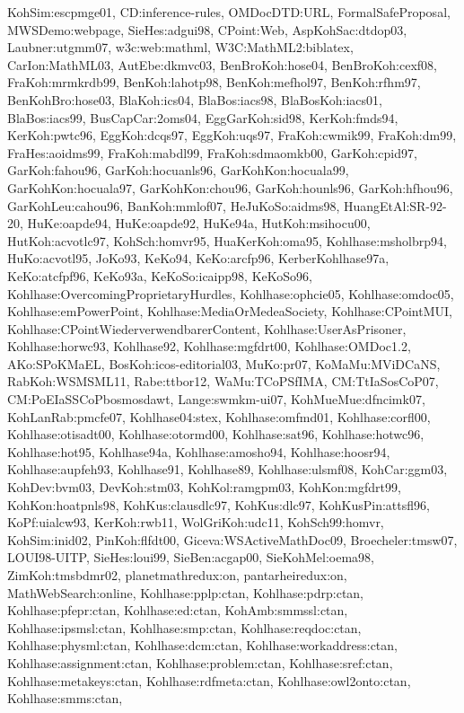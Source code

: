 {KohSim:escpmge01,
CD:inference-rules,
OMDocDTD:URL,
FormalSafeProposal,
MWSDemo:webpage,
SieHes:adgui98,
CPoint:Web,
AspKohSac:dtdop03,
Laubner:utgmm07,
w3c:web:mathml,
W3C:MathML2:biblatex,
CarIon:MathML03,
AutEbe:dkmvc03,
BenBroKoh:hose04,
BenBroKoh:cexf08,
FraKoh:mrmkrdb99,
BenKoh:lahotp98,
BenKoh:mefhol97,
BenKoh:rfhm97,
BenKohBro:hose03,
BlaKoh:ics04,
BlaBos:iacs98,
BlaBosKoh:iacs01,
BlaBos:iacs99,
BusCapCar:2oms04,
EggGarKoh:sid98,
KerKoh:fmds94,
KerKoh:pwtc96,
EggKoh:dcqs97,
EggKoh:uqs97,
FraKoh:cwmik99,
FraKoh:dm99,
FraHes:aoidms99,
FraKoh:mabdl99,
FraKoh:sdmaomkb00,
GarKoh:cpid97,
GarKoh:fahou96,
GarKoh:hocuanls96,
GarKohKon:hocuala99,
GarKohKon:hocuala97,
GarKohKon:chou96,
GarKoh:hounls96,
GarKoh:hfhou96,
GarKohLeu:cahou96,
BanKoh:mmlof07,
HeJuKoSo:aidms98,
HuangEtAl:SR-92-20,
HuKe:oapde94,
HuKe:oapde92,
HuKe94a,
HutKoh:msihocu00,
HutKoh:acvotlc97,
KohSch:homvr95,
HuaKerKoh:oma95,
Kohlhase:msholbrp94,
HuKo:acvotl95,
JoKo93,
KeKo94,
KeKo:arcfp96,
KerberKohlhase97a,
KeKo:atcfpf96,
KeKo93a,
KeKoSo:icaipp98,
KeKoSo96,
Kohlhase:OvercomingProprietaryHurdles,
Kohlhase:ophcie05,
Kohlhase:omdoc05,
Kohlhase:emPowerPoint,
Kohlhase:MediaOrMedeaSociety,
Kohlhase:CPointMUI,
Kohlhase:CPointWiederverwendbarerContent,
Kohlhase:UserAsPrisoner,
Kohlhase:horwc93,
Kohlhase92,
Kohlhase:mgfdrt00,
Kohlhase:OMDoc1.2,
AKo:SPoKMaEL,
BosKoh:icos-editorial03,
MuKo:pr07,
KoMaMu:MViDCaNS,
RabKoh:WSMSML11,
Rabe:ttbor12,
WaMu:TCoPSfIMA,
CM:TtIaSosCoP07,
CM:PoEIaSSCoPbosmosdawt,
Lange:swmkm-ui07,
KohMueMue:dfncimk07,
KohLanRab:pmcfe07,
Kohlhase04:stex,
Kohlhase:omfmd01,
Kohlhase:corfl00,
Kohlhase:otisadt00,
Kohlhase:otormd00,
Kohlhase:sat96,
Kohlhase:hotwc96,
Kohlhase:hot95,
Kohlhase94a,
Kohlhase:amosho94,
Kohlhase:hoosr94,
Kohlhase:aupfeh93,
Kohlhase91,
Kohlhase89,
Kohlhase:ulsmf08,
KohCar:ggm03,
KohDev:bvm03,
DevKoh:stm03,
KohKol:ramgpm03,
KohKon:mgfdrt99,
KohKon:hoatpnls98,
KohKus:clausdlc97,
KohKus:dlc97,
KohKusPin:attsfl96,
KoPf:uialcw93,
KerKoh:rwb11,
WolGriKoh:udc11,
KohSch99:homvr,
KohSim:inid02,
PinKoh:flfdt00,
Giceva:WSActiveMathDoc09,
Broecheler:tmsw07,
LOUI98-UITP,
SieHes:loui99,
SieBen:acgap00,
SieKohMel:oema98,
ZimKoh:tmsbdmr02,
planetmathredux:on,
pantarheiredux:on,
MathWebSearch:online,
Kohlhase:pplp:ctan,
Kohlhase:pdrp:ctan,
Kohlhase:pfepr:ctan,
Kohlhase:ed:ctan,
KohAmb:smmssl:ctan,
Kohlhase:ipsmsl:ctan,
Kohlhase:smp:ctan,
Kohlhase:reqdoc:ctan,
Kohlhase:physml:ctan,
Kohlhase:dcm:ctan,
Kohlhase:workaddress:ctan,
Kohlhase:assignment:ctan,
Kohlhase:problem:ctan,
Kohlhase:sref:ctan,
Kohlhase:metakeys:ctan,
Kohlhase:rdfmeta:ctan,
Kohlhase:owl2onto:ctan,
Kohlhase:smms:ctan,
}
